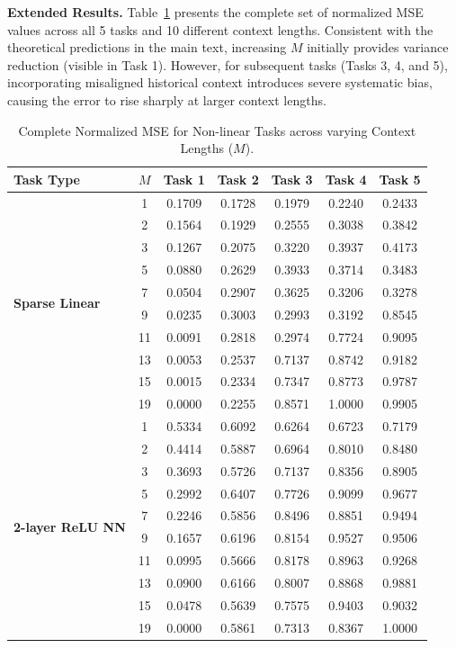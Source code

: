 \documentclass{article}
\theoremstyle{plain}
\theoremstyle{definition}
\theoremstyle{remark}
\begin{document}
\noindent \textbf{Extended Results.}
Table~\ref{tab:app_nonlinear_full} presents the complete set of normalized MSE values across all 5 tasks and 10 different context lengths. Consistent with the theoretical predictions in the main text, increasing $M$ initially provides variance reduction (visible in Task 1). However, for subsequent tasks (Tasks 3, 4, and 5), incorporating misaligned historical context introduces severe systematic bias, causing the error to rise sharply at larger context lengths.

\begin{table}[t]
\centering
\caption{Complete Normalized MSE for Non-linear Tasks across varying Context Lengths ($M$).}
\label{tab:app_nonlinear_full}
\begin{tabular}{lcccccc}
\toprule
\textbf{Task Type} & $M$ & \textbf{Task 1} & \textbf{Task 2} & \textbf{Task 3} & \textbf{Task 4} & \textbf{Task 5} \\
\midrule
\multirow{10}{*}{\textbf{Sparse Linear}} 
 & 1  & 0.1709 & 0.1728 & 0.1979 & 0.2240 & 0.2433 \\
 & 2  & 0.1564 & 0.1929 & 0.2555 & 0.3038 & 0.3842 \\
 & 3  & 0.1267 & 0.2075 & 0.3220 & 0.3937 & 0.4173 \\
 & 5  & 0.0880 & 0.2629 & 0.3933 & 0.3714 & 0.3483 \\
 & 7  & 0.0504 & 0.2907 & 0.3625 & 0.3206 & 0.3278 \\
 & 9  & 0.0235 & 0.3003 & 0.2993 & 0.3192 & 0.8545 \\
 & 11 & 0.0091 & 0.2818 & 0.2974 & 0.7724 & 0.9095 \\
 & 13 & 0.0053 & 0.2537 & 0.7137 & 0.8742 & 0.9182 \\
 & 15 & 0.0015 & 0.2334 & 0.7347 & 0.8773 & 0.9787 \\
 & 19 & 0.0000 & 0.2255 & 0.8571 & 1.0000 & 0.9905 \\
\midrule
\multirow{10}{*}{\textbf{2-layer ReLU NN}} 
 & 1  & 0.5334 & 0.6092 & 0.6264 & 0.6723 & 0.7179 \\
 & 2  & 0.4414 & 0.5887 & 0.6964 & 0.8010 & 0.8480 \\
 & 3  & 0.3693 & 0.5726 & 0.7137 & 0.8356 & 0.8905 \\
 & 5  & 0.2992 & 0.6407 & 0.7726 & 0.9099 & 0.9677 \\
 & 7  & 0.2246 & 0.5856 & 0.8496 & 0.8851 & 0.9494 \\
 & 9  & 0.1657 & 0.6196 & 0.8154 & 0.9527 & 0.9506 \\
 & 11 & 0.0995 & 0.5666 & 0.8178 & 0.8963 & 0.9268 \\
 & 13 & 0.0900 & 0.6166 & 0.8007 & 0.8868 & 0.9881 \\
 & 15 & 0.0478 & 0.5639 & 0.7575 & 0.9403 & 0.9032 \\
 & 19 & 0.0000 & 0.5861 & 0.7313 & 0.8367 & 1.0000 \\
\bottomrule
\end{tabular}
\end{table}
\end{document}
